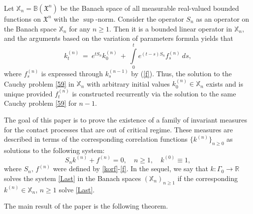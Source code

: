 \documentclass[a4paper,12pt]{article}
\newtheorem{remark}{Remark}[section]
\newcommand{\Ga}{\Gamma}
\newcommand{\BB}{{\mathbb B}}
\newcommand{\XX}{{\mathbb X}}
\newcommand{\R}{{\mathbb R}}
\newcommand{\XXX}{{\mathfrak{X}}}
\begin{document}
Let $\XX_{n} = \BB({\XXX}^n)$ be the Banach space of all measurable real-valued bounded functions on $\XXX^n$ with the $\sup$-norm.
Consider the operator $S_n$ as an operator on the Banach space $\XX_{n}$ for any $n\geq 1$. Then it is a bounded linear operator in $\XX_{n}$, and the arguments based on the variation of parameters formula yields that
\begin{equation}\label{61A}
k_{t}^{(n)} \ = \ e^{t S_n} k_{0}^{(n)} \ + \  \int\limits_0^t e^{(t-s) S_n} f_s^{(n)} \ ds,
\end{equation}
where $f_s^{(n)}$ is expressed through $k_s^{(n-1)}$ by (\ref{f}).
Thus, the solution to the Cauchy problem \eqref{59} in  $\XX_{n}$ with arbitrary initial values $k_{0}^{(n)}\in\XX_{n}$ exists and is unique provided $f_{t}^{(n)}$ is constructed recurrently via the
solution to the same Cauchy problem \eqref{59} for $n-1$.


The goal of this paper is to prove the existence of a family of invariant measures for the contact processes that are out of critical regime.
These measures are described in terms of the corresponding correlation functions
$\{k^{(n)}\}_{n\geq 0}$ as solutions to the following system: %
\begin{equation}\label{Last}
S_n k^{(n)} + f^{(n)}=0, \quad n \ge 1, \quad
k^{(0)}\equiv 1,
\end{equation}
where $S_n, \, f^{(n)}$ were defined by \eqref{korf}-\eqref{f}.
In the sequel, we say that $k:\Ga_{0}\to \R$ solves the system \eqref{Last} in the Banach spaces $(\XX_{n})_{n\geq 1}$ if the corresponding $k^{(n)}\in\XX_{n}$, $n\geq 1$ solve \eqref{Last}.

The main result of the paper is the following theorem.
\end{document}
